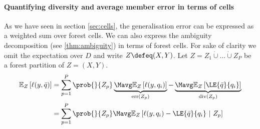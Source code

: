 \documentclass[
    a4paper, %
	fontsize=10pt, %
	twoside=false, %
]{kaobook}
\begin{document}
\begin{titlepage}
\paragraph{Quantifying diversity and average member error in terms of cells} As we have seen in section \ref{sec:cells}, the generalisation error can be expressed as a weighted sum over forest cells. 
We can also express the ambiguity decomposition (see \ref{thm:ambiguity}) in terms of forest cells.
For sake of clarity we omit the expectation over $D$ and write $Z \defeq (X,Y)$.  Let
$Z = Z_{1} \dot\cup \dots \dot\cup Z_{P}$ be a forest partition of $Z=(X,Y)$.
\begin{align*}
\mathbb{E}_{Z}\left[ \ell(y, \bar{q}) \right]  &= \sum_{p=1}^P \prob{}{Z_{p}}  
\underbrace{
\Mavg \mathbb{E}_{Z}\left[ \ell(y,q_{i})  \right] 
 }_{\text{err}(Z_p) }
 -  
 \underbrace{
\Mavg \mathbb{E}_{Z}\left[ \LE{\bar{q}}{q_{i}} \right]   
}_{\text{div}(Z_p) } 
\\
&= \sum_{p=1}^P \prob{}{Z_{p}} \Mavg \mathbb{E}_{Z}\left[ \ell(y,q_{i}) - \LE{\bar{q}}{q_{i}} ~|~ Z_p \right] 
\end{align*}


\end{titlepage}
\end{document}
